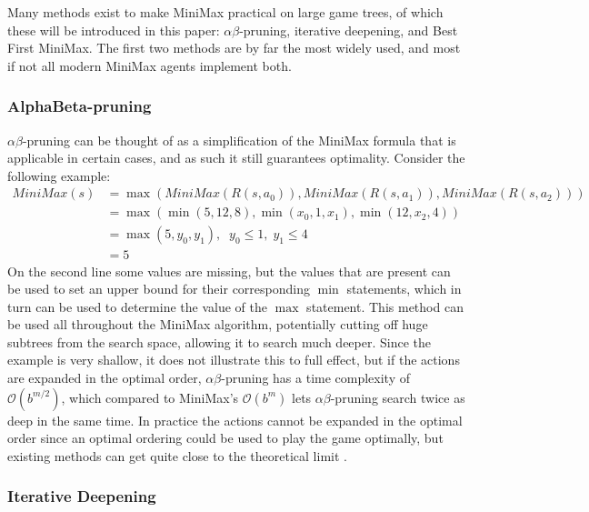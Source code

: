 Many methods exist to make MiniMax practical on large 
game trees, of which these will be introduced in this paper:
$\alpha\beta$-pruning, iterative deepening, and Best First MiniMax. 
The first two methods are by far the most widely used, and most
if not all modern MiniMax agents implement both.

\subsubsection{AlphaBeta-pruning}

$\alpha\beta$-pruning can be thought of as a simplification of
the MiniMax formula that is applicable in certain cases, and
as such it still guarantees optimality. Consider the following
example:
\begin{align*}
    MiniMax(s) &= \max(MiniMax(R(s, a_0)), MiniMax(R(s, a_1)), 
    MiniMax(R(s, a_2))) \\
    &= \max(\min(5, 12, 8), \min(x_0, 1, x_1), \min(12, x_2, 4)) \\
    &= \max(5, y_0, y_1), \;\; y_0 \leq 1, \; y_1 \leq 4 \\
    &= 5
\end{align*}
On the second line some values are missing, but the values that are present
can be used to set an upper bound for their corresponding $\min$ statements,
which in turn can be used to determine the value of the $\max$ statement.
This method can be used all throughout the MiniMax algorithm, potentially
cutting off huge subtrees from the search space, allowing it to search much
deeper. Since the example is very shallow, it does not illustrate this 
to full effect, but if the actions are expanded in the optimal order, 
$\alpha\beta$-pruning has a time complexity of $\mathcal{O}(b^{m/2})$, which
compared to MiniMax's $\mathcal{O}(b^{m})$ lets $\alpha\beta$-pruning search
twice as deep in the same time. In practice the actions cannot be expanded
in the optimal order since an optimal ordering could be used to play the
game optimally, but existing methods can get quite close to the theoretical
limit \needcit.



\subsubsection{Iterative Deepening}

